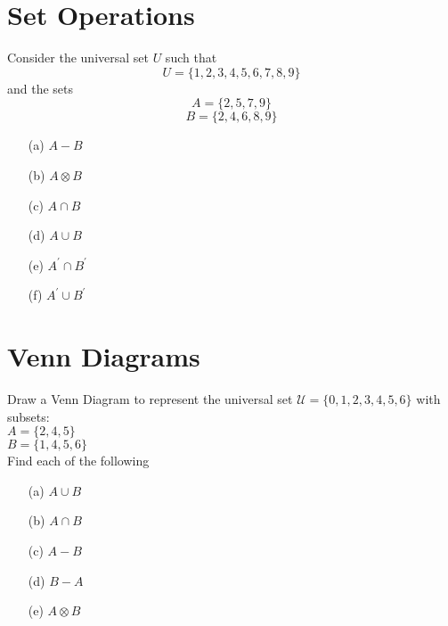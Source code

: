 \documentclass[]{report}
\begin{document}
\section*{Set Operations}
Consider the universal set $U$ such that
\[U=\{1,2,3,4,5,6,7,8,9\} \] 
and the sets
\[A=\{2,5,7,9\} \] 
\[B=\{2,4,6,8,9\} \]

\begin{itemize}
	\item[(a)] $A-B$
	\item[(b)] $A \otimes B$
	\item[(c)] $A \cap B$
	\item[(d)] $A \cup B$
	\item[(e)] $A^{\prime} \cap B^{\prime}$
	\item[(f)] $A^{\prime} \cup B^{\prime}$
\end{itemize}


\section*{Venn Diagrams}

Draw a Venn Diagram to represent the universal set
$\mathcal{U} = \{0,1,2,3,4,5,6\}$ with subsets:\\
$A = \{2,4,5\}$\\
$B = \{1,4,5,6\}$\\

\noindent Find each of the following
\begin{itemize}
	\item[(a)] $A \cup B $
	\item[(b)] $A \cap B $
	\item[(c)] $A-B$
	\item[(d)] $B-A$
	\item[(e)] $A \otimes B$
\end{itemize}
\end{document}

